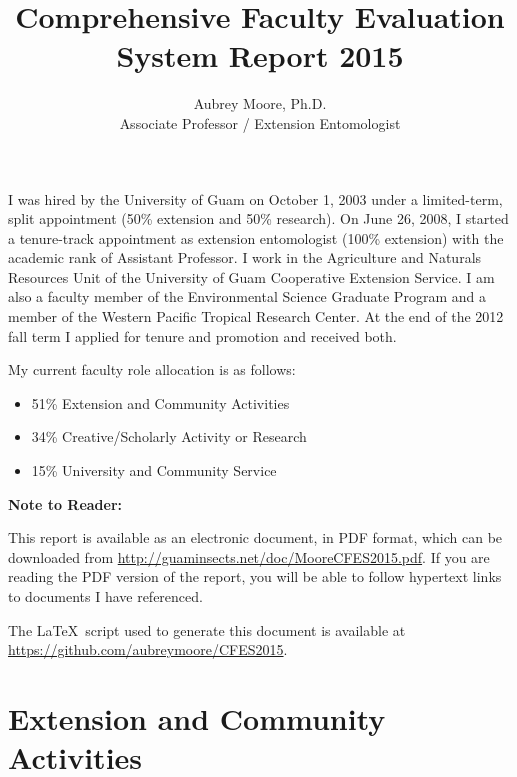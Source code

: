 \documentclass[12pt,oneside,english]{scrbook}
\begin{document}

\title{Comprehensive Faculty Evaluation System Report 2015}
\author{Aubrey Moore, Ph.D.\\
Associate Professor / Extension Entomologist}
\maketitle

I was hired by the University of Guam on October 1, 2003 under a limited-term,
split appointment (50\% extension and 50\% research). On June 26,
2008, I started a tenure-track appointment as extension entomologist (100\% extension)
with the academic rank of Assistant Professor. I work in the Agriculture and Naturals Resources Unit of the University of Guam Cooperative Extension Service. I am also a faculty member
of the Environmental Science Graduate Program and a member of the
Western Pacific Tropical Research Center. At the end of the 2012 fall
term I applied for tenure and promotion and received both.

My current faculty role allocation is as follows:
\begin{itemize}
	\item 51\% Extension and Community Activities 
	\item 34\% Creative/Scholarly Activity or Research 
	\item 15\% University and Community Service
\end{itemize}

\vfill
\textbf{Note to Reader:}

This report is available as an electronic document, in PDF format, which can
be downloaded from \url{http://guaminsects.net/doc/MooreCFES2015.pdf}. If you are reading the PDF version of the report, you will be able to follow hypertext links to documents I have referenced. 

The \LaTeX\ script used to generate this document 
is available at \url{https://github.com/aubreymoore/CFES2015}.

\tableofcontents{}


\chapter{Extension and Community Activities}
\end{document}
